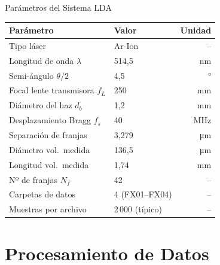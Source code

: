 \documentclass[aspectratio=169,12pt]{beamer}
\begin{document}
\begin{frame}{Parámetros del Sistema LDA}
	\centering
	\begin{tabular}{llr}
		\toprule
		\textbf{Parámetro}            & \textbf{Valor}
		                              & \textbf{Unidad}        \\
		\midrule
		Tipo láser                    & Ar-Ion            & -- \\
		Longitud de onda $\lambda$    & 514,5
		                              & \si{\nm}               \\
		Semi-ángulo $\theta/2$        & 4,5
		                              & \si{\degree}           \\
		Focal lente transmisora $f_L$ & 250
		                              & \si{\mm}               \\
		Diámetro del haz $d_b$        & 1,2
		                              & \si{\mm}               \\
		Desplazamiento Bragg $f_s$    & 40
		                              & \si{\MHz}              \\
		Separación de franjas         & 3,279
		                              & \si{\micro\metre}      \\
		Diámetro vol.\ medida         & 136,5
		                              & \si{\micro\metre}      \\
		Longitud vol.\ medida         & 1,74
		                              & \si{\mm}               \\
		Nº de franjas $N_f$           & 42
		                              & --                     \\
		Carpetas de datos             & 4 (FX01--FX04)
		                              & --                     \\
		Muestras por archivo          & 2\,000 (típico)
		                              & --                     \\
		\bottomrule
	\end{tabular}
\end{frame}

\section{Procesamiento de Datos}
\end{document}
